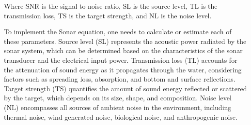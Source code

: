 Where
SNR is the signal-to-noise ratio,
SL is the source level,
TL is the transmission loss,
TS is the target strength, and
NL is the noise level.

To implement the Sonar equation, one needs to calculate or estimate each of these parameters. 
Source level (SL) represents the acoustic power radiated by the sonar system, which can be determined based on the characteristics of the sonar transducer and the electrical input power. 
Transmission loss (TL) accounts for the attenuation of sound energy as it propagates through the water, considering factors such as spreading loss, absorption, and bottom and surface reflections. 
Target strength (TS) quantifies the amount of sound energy reflected or scattered by the target, which depends on its size, shape, and composition. 
Noise level (NL) encompasses all sources of ambient noise in the environment, including thermal noise, wind-generated noise, biological noise, and anthropogenic noise.

